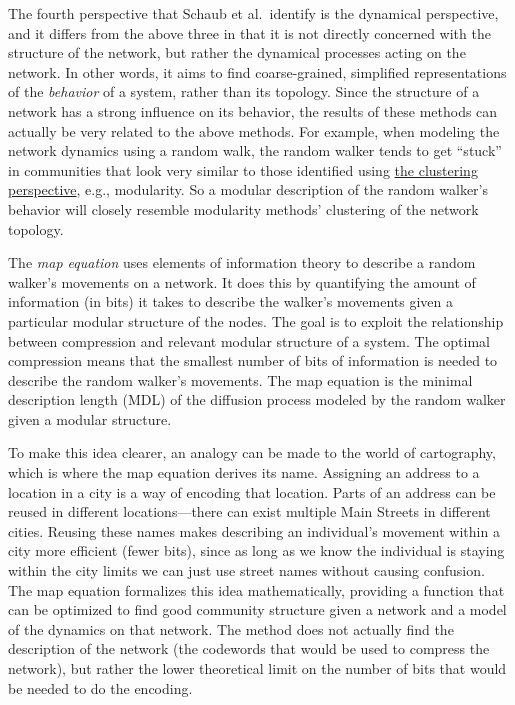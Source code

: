 The fourth perspective that Schaub et al.~identify is the dynamical
perspective, and it differs from the above three in that it is not
directly concerned with the structure of the network, but rather the
dynamical processes acting on the network. In other words, it aims to
find coarse-grained, simplified representations of the \emph{behavior}
of a system, rather than its topology. Since the structure of a network
has a strong influence on its behavior, the results of these methods can
actually be very related to the above methods. For example, when
modeling the network dynamics using a random walk, the random walker
tends to get ``stuck'' in communities that look very similar to those
identified using \protect\hyperlink{the-clustering-perspective}{the
clustering perspective}, e.g., modularity. So a modular description of
the random walker's behavior will closely resemble modularity methods'
clustering of the network topology.

The \emph{map equation} uses elements of information theory to describe
a random walker's movements on a network. It does this by quantifying
the amount of information (in bits) it takes to describe the walker's
movements given a particular modular structure of the nodes. The goal is
to exploit the relationship between compression and relevant modular
structure of a system. The optimal compression means that the smallest
number of bits of information is needed to describe the random walker's
movements. The map equation is the minimal description length (MDL) of
the diffusion process modeled by the random walker given a modular
structure.

To make this idea clearer, an analogy can be made to the world of
cartography, which is where the map equation derives its name. Assigning
an address to a location in a city is a way of encoding that location.
Parts of an address can be reused in different locations---there can
exist multiple Main Streets in different cities. Reusing these names
makes describing an individual's movement within a city more efficient
(fewer bits), since as long as we know the individual is staying within
the city limits we can just use street names without causing confusion.
The map equation formalizes this idea mathematically, providing a
function that can be optimized to find good community structure given a
network and a model of the dynamics on that network. The method does not
actually find the description of the network (the codewords that would
be used to compress the network), but rather the lower theoretical limit
on the number of bits that would be needed to do the encoding.

